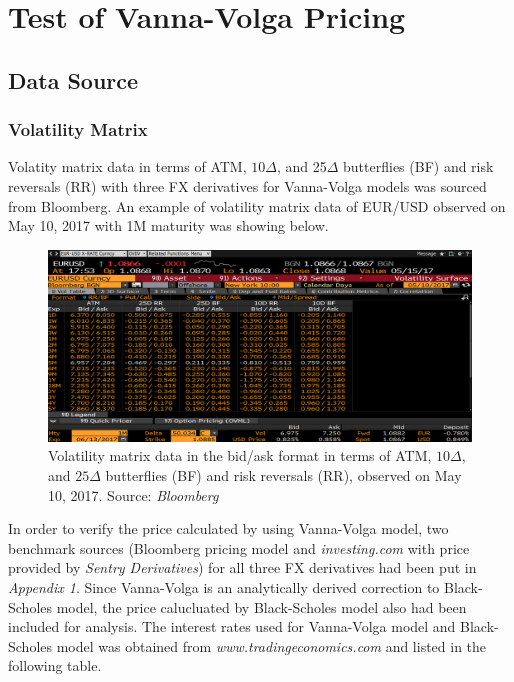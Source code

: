 \chapter{Test of Vanna-Volga Pricing}


\section{Data Source}
\subsection{Volatility Matrix}
Volatity matrix data in terms of ATM, $10\Delta$, and 25$\Delta$ butterflies (BF) and risk reversals (RR) with three FX derivatives for Vanna-Volga models was sourced from Bloomberg. An example of volatility matrix data of EUR/USD observed on May 10, 2017 with 1M maturity was showing below.

\begin{figure}[htb]
	\centering
	\includegraphics[scale=0.3]{./Testing-data/EURUSD.png} 
	\caption{Volatility matrix data in the bid/ask format in terms of ATM, $10\Delta$, and $25\Delta$ butterflies (BF) and risk reversals (RR), observed on May 10, 2017. Source: \textit{Bloomberg}}
	\label{fig:label} %
\end{figure}
\noindent
In order to verify the price calculated by using Vanna-Volga model, two benchmark sources (Bloomberg pricing model and \textit{investing.com} with price provided by \textit{Sentry Derivatives}) for all three FX derivatives had been put in \textit{Appendix 1}. Since Vanna-Volga is an analytically derived correction to Black-Scholes model, the price calucluated by Black-Scholes model also had been included for analysis.
\newline
\newline
The interest rates used for Vanna-Volga model and Black-Scholes model was obtained from \textit{www.tradingeconomics.com} and listed in the following table.

